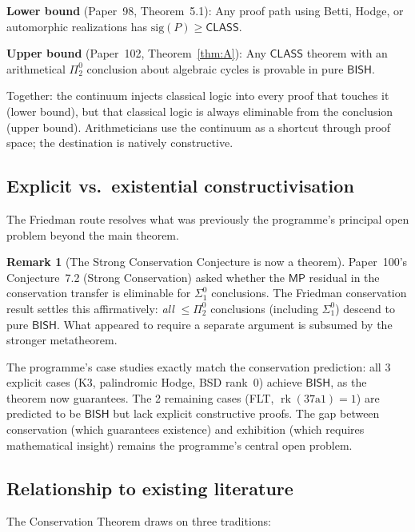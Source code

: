 \documentclass[11pt,a4paper]{article}
\theoremstyle{plain}
\theoremstyle{definition}
\newtheorem{remark}[theorem]{Remark}
\newcommand{\BISH}{\textsf{BISH}}
\newcommand{\MP}{\textsf{MP}}
\newcommand{\CLASS}{\textsf{CLASS}}
\newcommand{\sig}{\mathrm{sig}}
\DeclareMathOperator{\rk}{rk}
\begin{document}
\noindent\textbf{Lower bound} (Paper~98, Theorem~5.1): Any proof path using Betti, Hodge, or automorphic realizations has $\sig(P) \ge \CLASS$.

\noindent\textbf{Upper bound} (Paper~102, Theorem~\ref{thm:A}): Any $\CLASS$ theorem with an arithmetical $\Pi^0_2$ conclusion about algebraic cycles is provable in pure $\BISH$.

\noindent Together: the continuum injects classical logic into every proof that touches it (lower bound), but that classical logic is always eliminable from the conclusion (upper bound).  Arithmeticians use the continuum as a shortcut through proof space; the destination is natively constructive.

\subsection{Explicit vs.\ existential constructivisation}

The Friedman route resolves what was previously the programme's principal open problem beyond the main theorem.

\begin{remark}[The Strong Conservation Conjecture is now a theorem]\label{rem:strong}
Paper~100's Conjecture~7.2 (Strong Conservation) asked whether the $\MP$ residual in the conservation transfer is eliminable for $\Sigma^0_1$ conclusions.  The Friedman conservation result settles this affirmatively: \emph{all} $\le \Pi^0_2$ conclusions (including $\Sigma^0_1$) descend to pure $\BISH$.  What appeared to require a separate argument is subsumed by the stronger metatheorem.
\end{remark}

The programme's case studies exactly match the conservation prediction: all 3 explicit cases (K3, palindromic Hodge, BSD rank~0) achieve $\BISH$, as the theorem now guarantees.  The 2 remaining cases (FLT, $\rk(37\mathrm{a}1) = 1$) are predicted to be $\BISH$ but lack explicit constructive proofs.  The gap between conservation (which guarantees existence) and exhibition (which requires mathematical insight) remains the programme's central open problem.

\subsection{Relationship to existing literature}

The Conservation Theorem draws on three traditions:
\end{document}
